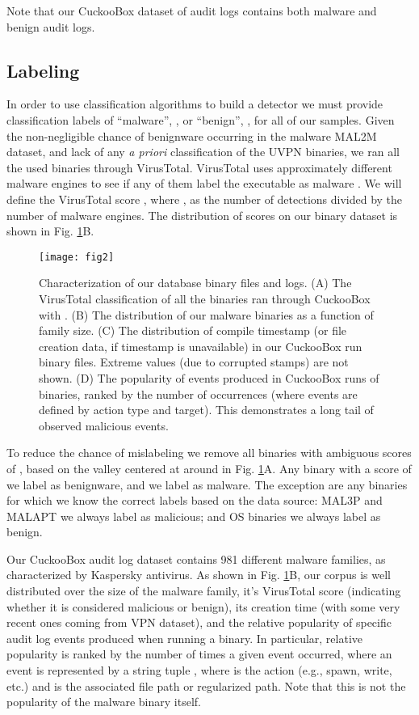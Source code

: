 \documentclass{sig-alternate-2013}
\newcommand{\eg}{e.g.\xspace}
\newcommand{\etc}{etc.\xspace}
\newcommand{\apriori}{\emph{a priori}\xspace}
\begin{document}
Note that our CuckooBox dataset of audit logs contains both malware and benign audit logs.

\subsection{Labeling}

In order to use classification algorithms to build a detector we must provide classification labels of ``malware'', , or ``benign'', ,  for all of our samples. Given the non-negligible chance of benignware occurring in the malware MAL2M dataset, and lack of any \apriori classification of the UVPN binaries, we ran all the used binaries through VirusTotal. VirusTotal uses approximately  different malware engines to see if any of them label the executable as malware \cite{virustotal2015}. We will define the VirusTotal score , where , as the number of detections divided by the number of malware engines. The distribution of scores on our binary dataset is shown in Fig. \ref{fig:data}B.

\begin{figure}[ht]
	\center
	\texttt{[image: fig2]}
   \caption{Characterization of our database binary files and logs. (A) The VirusTotal classification of all the binaries ran through CuckooBox with . (B) The distribution of our malware binaries as a function of family size.  (C) The distribution of compile timestamp (or file creation data, if timestamp is unavailable) in our CuckooBox run binary files. Extreme values (due to corrupted stamps) are not shown. (D) The popularity of events produced in CuckooBox runs of binaries, ranked by the number of occurrences (where events are defined by action type and target). This demonstrates a long tail of observed malicious events. }
   \label{fig:data}
\end{figure}

To reduce the chance of mislabeling we remove all binaries with ambiguous scores of , based on the valley centered at around  in Fig. \ref{fig:data}A. Any binary with a score of  we label as benignware, and  we label as malware. The exception are any binaries for which we know the correct labels based on the data source: MAL3P and MALAPT we always label as malicious; and OS binaries we always label as benign.

Our CuckooBox audit log dataset contains 981 different malware families, as characterized by Kaspersky antivirus. As shown in Fig. \ref{fig:data}B, our corpus is well distributed over the size of the malware family, it's VirusTotal score (indicating whether it is considered malicious or benign), its creation time (with some very recent ones coming from VPN dataset), and the relative popularity of specific audit log events produced when running a binary. In particular, relative popularity is ranked by the number of times a given event occurred, where an event is represented by a string tuple , where  is the action (\eg, spawn, write, \etc) and  is the associated file path or regularized path. Note that this is not the popularity of the malware binary itself. 
\end{document}
